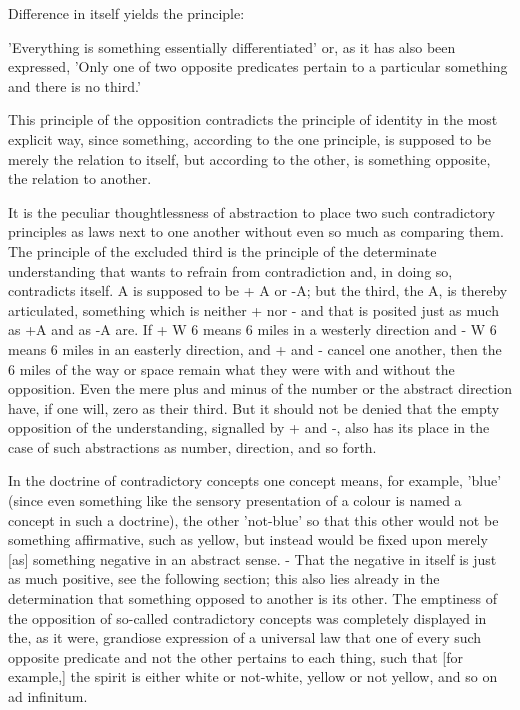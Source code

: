     Difference in itself yields the principle:

    'Everything is something essentially differentiated' or,
    as it has also been expressed,
    'Only one of two opposite predicates pertain to
    a particular something and there is no third.'

    This principle of the opposition contradicts
    the principle of identity in the most explicit way,
    since something, according to the one principle,
    is supposed to be merely the relation to itself,
    but according to the other, is something opposite,
    the relation to another.

    It is the peculiar thoughtlessness of abstraction to place
    two such contradictory principles as laws next to one another
    without even so much as comparing them.
    The principle of the excluded third is the
    principle of the determinate understanding that wants to refrain
    from contradiction and, in doing so, contradicts itself.
    A is supposed to be + A or -A;
    but the third, the A, is thereby articulated,
    something which is neither + nor - and that is posited just as much
    as +A and as -A are.
    If + W 6 means 6 miles in a westerly direction
    and - W 6 means 6 miles in an easterly direction,
    and + and - cancel one another, then the 6 miles of the way or
    space remain what they were with and without the opposition.
    Even the mere plus and minus of the number or the abstract direction
    have, if one will, zero as their third.
    But it should not be denied that the empty opposition of the understanding,
    signalled by + and -, also has its place in the case of such abstractions
    as number, direction, and so forth.

    In the doctrine of contradictory concepts one concept means, for
    example, 'blue' (since even something like the sensory presentation
    of a colour is named a concept in such a doctrine), the other
    'not-blue' so that this other would not be something affirmative,
    such as yellow, but instead would be fixed upon merely [as]
    something negative in an abstract sense. - That the negative in itself
    is just as much positive, see the following section; this also lies
    already in the determination that something opposed to another
    is its other. The emptiness of the opposition of so-called
    contradictory concepts was completely displayed in the, as it were,
    grandiose expression of a universal law that one of every such
    opposite predicate and not the other pertains to each thing, such
    that [for example,] the spirit is either white or not-white, yellow or
    not yellow, and so on ad infinitum.

